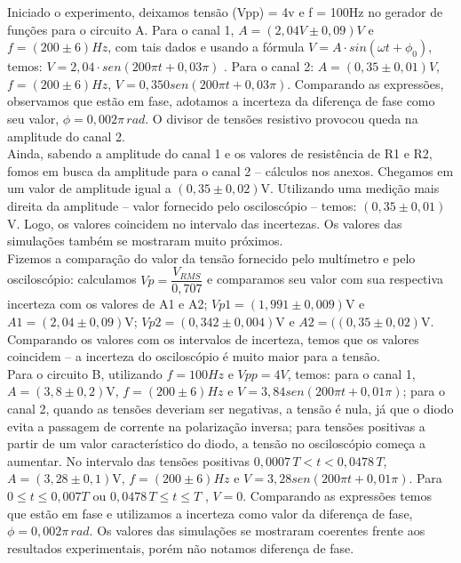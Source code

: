 \documentclass[a4paper, 11pt]{article}
\begin{document}
Iniciado o experimento, deixamos tensão (Vpp) = 4v e f = 100Hz no gerador de funções para o circuito A. Para o canal 1, $A = (2,04V \pm 0,09)V$  e $f = (200 \pm 6)Hz$, com tais dados e usando a fórmula $V = A \cdot sin(\omega t + \phi_{0})$, temos: $V = 2,04 \cdot sen(200\pi t + 0,03\pi)$ . Para o canal 2: $A = (0,35 \pm 0,01)V$, $f = (200 \pm 6)Hz$, $V = 0,350sen(200\pi t + 0,03\pi)$. Comparando as expressões, observamos que estão em fase, adotamos a incerteza da diferença de fase como seu valor, $\phi = 0,002 \pi \, rad$. O divisor de tensões resistivo provocou queda na amplitude do canal 2. \\

Ainda, sabendo a amplitude do canal 1 e os valores de resistência de R1 e R2, fomos em busca da amplitude para o canal 2 – cálculos nos anexos. Chegamos em um valor de amplitude igual a $(0,35 \pm 0,02)$V. Utilizando uma medição mais direita da amplitude – valor fornecido pelo osciloscópio – temos: $(0,35 \pm 0,01)$V. Logo, os valores coincidem no intervalo das incertezas. Os valores das simulações também se mostraram muito próximos.\\

Fizemos a comparação do valor da tensão fornecido pelo multímetro e pelo osciloscópio: calculamos $Vp = \dfrac{ V_{RMS} }{0,707}$  e comparamos seu valor com sua respectiva incerteza com os valores de A1 e A2; $Vp1 = (1,991 \pm 0,009)$V e $A1 = (2,04 \pm 0,09)$V; $Vp2 = (0,342 \pm 0,004)$V e $A2 = ((0,35 \pm 0,02)$V. Comparando os valores com os intervalos de incerteza, temos que os valores coincidem – a incerteza do osciloscópio é muito maior para a tensão.\\

Para o circuito B, utilizando $f = 100Hz$ e $Vpp = 4V$, temos: para o canal 1, $A = (3,8 \pm 0,2)$V, $f = (200 \pm 6)Hz$ e $V = 3,84sen(200 \pi t + 0,01 \pi)$; para o canal 2, quando as tensões deveriam ser negativas, a tensão é nula, já que o diodo evita a passagem de corrente na polarização inversa; para tensões positivas a partir de um valor característico do diodo, a tensão no osciloscópio começa a aumentar. No intervalo das tensões positivas $0,0007 \, T < t < 0,0478 \, T$, $A = (3,28 \pm 0,1)$V, $f = (200 \pm 6)Hz$ e $V = 3,28sen(200 \pi t + 0,01 \pi)$. Para $0 \leq t \leq 0,007T$ ou $0,0478 \, T \leq t \leq T$ , $V= 0$.  Comparando as expressões temos que estão em fase e utilizamos a incerteza como valor da diferença de fase, $\phi = 0,002 \pi \, rad$.  Os valores das simulações se mostraram coerentes frente aos resultados experimentais, porém não notamos diferença de fase.\\
\end{document}
